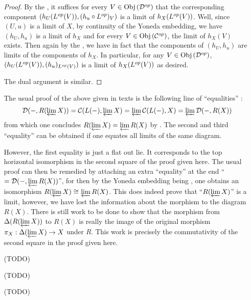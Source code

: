 \begin{proof}
  By the ,
  it suffices for every $V \in \mathrm{Obj}\left(\mathcal{D}^{op}\right)$ that the corresponding component
  $(h_U(L^{op}(V)),(h_u\circ L^{op})_V)$ is a limit of $h_X(L^{op}(V))$.
  Well, since $(U,u)$ is a limit of $X$,
  by continuity of the Yoneda embedding, 
  we have $(h_U,h_u)$ is a limit of $h_X$ and for every $V \in \mathrm{Obj}\left(\mathcal{C}^{op}\right)$,
  the limit of $h_X(V)$ exists. 
  Then again by the 
  ,
  we have in fact that the components of $(h_U,h_u)$ are 
  limits of the components of $h_X$.
  In particular, for any $V \in \mathrm{Obj}\left(\mathcal{D}^{op}\right)$,
  $(h_U(L^{op}(V)),(h_u)_{L^{op}(V)})$ is a limit of $h_X(L^{op}(V))$ as desired.
  
  The dual argument is similar. 
\end{proof}

\begin{rmk}
  The usual proof of the above given in texts is 
  the following line of ``equalities'' : 
  \begin{align*}
    \mathcal{D}(-,R(\varprojlim X)) = \mathcal{C}(L(-),\varprojlim X)
    = \varprojlim \mathcal{C}(L(-),X)
    = \varprojlim \mathcal{D}(-,R(X))
  \end{align*}
  from which one concludes $R(\varprojlim X) = \varprojlim R(X)$ by 
  .
  The second and third ``equality'' can be obtained if 
  one equates all limits of the same diagram. 

  However, the first equality is just a flat out lie.
  It corresponds to the top horizontal isomorphism in the second square 
  of the proof given here. 
  The usual proof can then be remedied by 
  attaching an extra ``equality'' at the end ``$= \mathcal{D}(-,\varprojlim R(X))$'',
  for then by the Yoneda embedding being ,
  one obtains an isomorphism $R(\varprojlim X) \cong_{} \varprojlim R(X)$.
  This does indeed prove that ``$R(\varprojlim X)$'' is a limit, however, 
  we have lost the information about the morphism to the diagram $R(X)$.
  There is still work to be done to show that
  the morphism from $\Delta(R(\varprojlim X))$ to $R(X)$ is really 
  the image of the original morphism $\pi_X : \Delta(\varprojlim X) \to X$ under $R$.
  This work is precisely the commutativity of the 
  second square in the proof given here.
\end{rmk}

\begin{cor}
  
  (TODO)
\end{cor}

\begin{dfn}\label{filtered}
  
  (TODO)
\end{dfn}

\begin{prop}
  \label{filtered_colimits_commute}

  (TODO)
\end{prop}